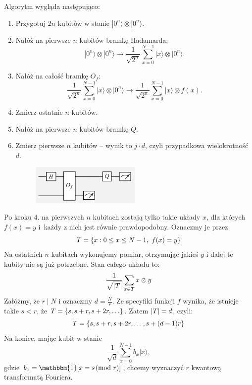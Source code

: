 \newpage
Algorytm wygląda następująco:
\begin{greyframe}
	\begin{enumerate}
		\item Przygotuj \( 2n \) kubitów w stanie \( |0^n\rangle \otimes |0^n\rangle \).
		\item Nałóż na pierwsze \( n \) kubitów bramkę Hadamarda:
		      \[
			      |0^n\rangle \otimes |0^n\rangle \rightarrow \frac{1}{\sqrt{2^n}} \sum_{x=0}^{N-1} |x\rangle \otimes |0^n\rangle.
		      \]
		\item Nałóż na całość bramkę \( O_f \):
		      \[
			      \frac{1}{\sqrt{2^n}} \sum_{x=0}^{N-1} |x\rangle \otimes |0^n\rangle \rightarrow \frac{1}{\sqrt{2^n}} \sum_{x=0}^{N-1} |x\rangle \otimes f(x).
		      \]
		\item Zmierz ostatnie \( n \) kubitów.
		\item Nałóż na pierwsze \( n \) kubitów bramkę \( Q \).
		\item Zmierz pierwsze \( n \) kubitów -- wynik to \( j \cdot d \), czyli przypadkowa wielokrotność \( d \).
		      \begin{figure}[H]
			      \centering
			      \includegraphics[width=0.5\textwidth]{img/shor_circuit.png}
		      \end{figure}
	\end{enumerate}
\end{greyframe}
Po kroku 4. na pierwszych \( n \) kubitach zostają tylko takie układy \( x \), dla których \( f(x) = y \) i~każdy z nich jest równie prawdopodobny.
Oznaczmy je przez
\[
	T = \set{x : 0 \leq x \leq N-1,\ f(x) = y}
\]
Na ostatnich \( n \) kubitach wykonujemy pomiar, otrzymując jakieś \( y \) i dalej te kubity nie są już potrzebne. Stan całego układu to:
\[
	\frac{1}{\sqrt{\left\lvert T\right\rvert}} \sum_{x \in T} x \otimes y
\]
Załóżmy, że \( r \mid N \) i oznaczmy \( d = \frac{N}{r} \). Ze specyfiki funkcji \( f \) wynika, że istnieje takie \( s < r \), że \( T = \set{s, s + r, s + 2r, \ldots} \). Zatem \( \left\lvert T\right\rvert = d \), czyli:
\[
	T = \set{s, s + r, s + 2r, \ldots, s + (d - 1)r}
\]
Na koniec, mając kubit w stanie
\[
	\frac{1}{\sqrt{d}} \sum_{x=0}^{N-1} b_x |x\rangle,
\]
gdzie \( b_x = \mathbbm{1}[x = s \!\!\pmod{r}] \), chcemy wyznaczyć \( r \) kwantową transformatą Fouriera.

